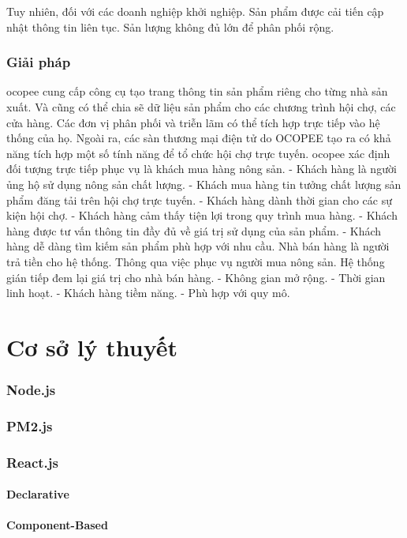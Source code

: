 \documentclass{report}
\begin{document}
Tuy nhiên, đối với các doanh nghiệp khởi nghiệp. Sản phẩm được cải tiến cập nhật thông tin liên tục. Sản lượng không đủ lớn để phân phối rộng.
\pagebreak

\section*{Giải pháp}
\gls{ocopee} cung cấp công cụ tạo trang thông tin sản phẩm riêng cho từng nhà sản xuất. Và cũng có thể chia sẽ dữ liệu sản phẩm cho các chương trình hội chợ, các cửa hàng. Các đơn vị phân phối và triễn lãm có thể tích hợp trực tiếp vào hệ thống của họ.
Ngoài ra, các sàn thương mại điện tử do OCOPEE tạo ra có khả năng tích hợp một số tính năng để tổ chức hội chợ trực tuyến.
\gls{ocopee} xác định đối tượng trực tiếp phục vụ là khách mua hàng nông sản.
- Khách hàng là người ủng hộ sử dụng nông sản chất lượng.
- Khách mua hàng tin tưởng chất lượng sản phẩm đăng tải trên hội chợ trực tuyến.
- Khách hàng dành thời gian cho các sự kiện hội chợ.
- Khách hàng cảm thấy tiện lợi trong quy trình mua hàng.
- Khách hàng được tư vấn thông tin đầy đủ về giá trị sử dụng của sản phẩm.
- Khách hàng dễ dàng tìm kiếm sản phẩm phù hợp với nhu cầu.
Nhà bán hàng là người trả tiền cho hệ thống. Thông qua việc phục vụ người mua nông sản. Hệ thống gián tiếp đem lại giá
trị cho nhà bán hàng.
- Không gian mở rộng.
- Thời gian linh hoạt.
- Khách hàng tiềm năng.
- Phù hợp với quy mô.


\part{Cơ sở lý thuyết}
\section{Node.js}
\section{PM2.js}
\section{React.js} 
\subsection{Declarative}
\subsection{Component-Based}
\end{document}
